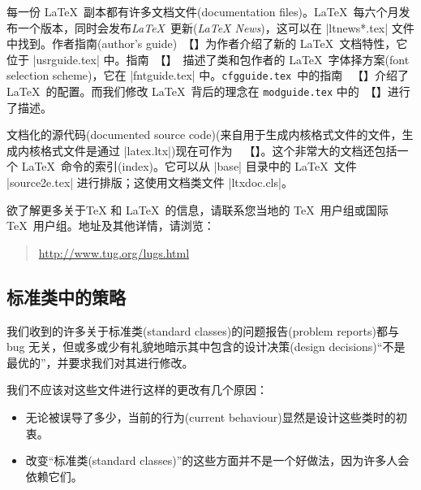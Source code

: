 \documentclass{ltxguide}[1995/11/28]
\begin{document}
每一份 \LaTeX{}\ 副本都有许多文档文件(documentation files)。\LaTeX{}\ 每六个月发布一个版本，同时会发布{\emph{\LaTeX{}}}\ {\kaiti 更新}(\emph{\LaTeX{} News})，这可以在 |ltnews*.tex| 文件中找到。作者指南(author's guide)\ {\color{blue}{\emph{\usrguide}}}【{\color{blue}{《\LaTeXe\ 作者指南》}}】为作者介绍了新的 \LaTeX{}\ 文档特性，它位于 |usrguide.tex| 中。指南\ {\color{blue}{\emph{\fntguide}}}【{\color{blue}{《\LaTeXe\ 的字体选择》}}】\ 描述了类和包作者的 \LaTeX{}\ 字体择方案(font selection scheme)，它在 |fntguide.tex| 中。\texttt{cfgguide.tex}\ 中的指南\ {\color{blue} {\emph{\cfgguide}}}【{\color{blue}{《\LaTeXe\ 的配置选项指南》}}】介绍了 \LaTeX{}\ 的配置。而我们修改 \LaTeX{}\ 背后的理念在 \texttt{modguide.tex} 中的\ {\color{blue}{\emph{\modguide}}}【{}】进行了描述。

文档化的源代码(documented source code)(来自用于生成内核格式文件的文件，生成内核格式文件是通过 |latex.ltx|)现在可作为\ {}\ 【{\color{blue}{《\LaTeXe\ 源代码》}}】。这个非常大的文档还包括一个 \LaTeX{}\ 命令的索引(index)。它可以从 |base| 目录中的 \LaTeX{}\ 文件 |source2e.tex| 进行排版；这使用文档类文件 |ltxdoc.cls|。

欲了解更多关于\TeX{} 和 \LaTeX{}\ 的信息，请联系您当地的 \TeX{}\ 用户组或国际 \TeX{}\ 用户组。地址及其他详情，请浏览：
\vspace*{-2ex}
\begin{quote}\small\label{addrs}
   \url{http://www.tug.org/lugs.html}
\end{quote}
\vspace*{-5ex}

\subsection[标准类中的策略]{\heiti 标准类中的策略}

我们收到的许多关于标准类(standard classes)的问题报告(problem reports)都与 bug 无关，但或多或少有礼貌地暗示其中包含的设计决策(design decisions)“不是最优的”，并要求我们对其进行修改。

我们不应该对这些文件进行这样的更改有几个原因：
\begin{itemize}
   \item
         无论被误导了多少，当前的行为(current behaviour)显然是设计这些类时的初衷。
   \item
         改变“标准类(standard classes)”的这些方面并不是一个好做法，因为许多人会依赖它们。
\end{itemize}
\end{document}
